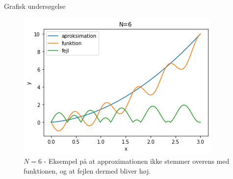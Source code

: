 \begin{frame}{Grafisk undersøgelse}
    \begin{figure}[h!]
    \begin{center}
    \includegraphics[scale=0.5]{Images/N=6.png}
    \end{center}
    \caption{$N = 6$ - Eksempel på at approximationen ikke stemmer overens med funktionen, og at fejlen dermed bliver høj.}
    \end{figure} 
    
\end{frame}